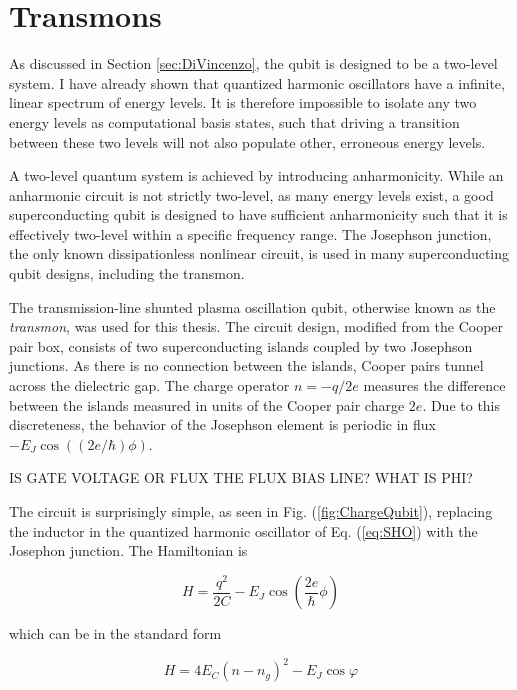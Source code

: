 \documentclass[12 pt]{book}
\begin{document}
\section{Transmons}
As discussed in Section \ref{sec:DiVincenzo}, the qubit is designed to be a two-level system. I have already shown that quantized harmonic oscillators have a infinite, linear spectrum of energy levels. It is therefore impossible to isolate any two energy levels as computational basis states, such that driving a transition between these two levels will not also populate other, erroneous energy levels. 

A two-level quantum system is achieved by introducing anharmonicity. While an anharmonic circuit is not strictly two-level, as many energy levels exist, a good superconducting qubit is designed to have sufficient anharmonicity such that it is effectively two-level within a specific frequency range. The Josephson junction\cite{Devoret2004}, the only known dissipationless nonlinear circuit, is used in many superconducting qubit designs, including the transmon. 

The transmission-line shunted plasma oscillation qubit\cite{Koch}, otherwise known as the \emph{transmon}, was used for this thesis. The circuit design, modified from the Cooper pair box\cite{Bouchiat, NakamuraCoherent}, consists of two superconducting islands coupled by two Josephson junctions. As there is no connection between the islands, Cooper pairs tunnel across the dielectric gap. The charge operator $n=-q/2e$ measures the difference between the islands measured in units of the Cooper pair charge $2e$. Due to this discreteness, the behavior of the Josephson element is periodic in flux $-E_J\cos((2e/\hbar)\phi)$. 

IS GATE VOLTAGE OR FLUX THE FLUX BIAS LINE? WHAT IS PHI?

The circuit is surprisingly simple, as seen in Fig. (\ref{fig:ChargeQubit}), replacing the inductor in the quantized harmonic oscillator of Eq. (\ref{eq:SHO}) with the Josephon junction. The Hamiltonian is

\begin{equation}
H=\frac{q^2}{2C}-E_J\cos\left(   \frac{2e}{\hbar}\phi     \right)
\end{equation}

which can be in the standard form

\begin{equation}\label{eq:TransmonHamiltonian}
H=4E_C(n-n_g)^2-E_J\cos\varphi
\end{equation}
\end{document}
